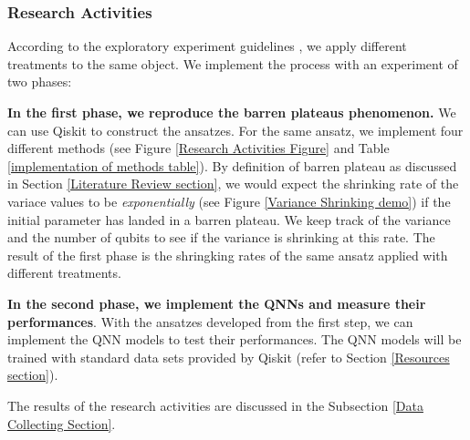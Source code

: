 \subsubsection{Research Activities} \label{Research Activities section}
According to the exploratory experiment guidelines \cite{wohlinExperimentationSoftwareEngineering2012}, we apply different treatments to the same object.
We implement the process with an experiment of two phases:

\textbf{In the first phase, we reproduce the barren plateaus phenomenon.}
We can use Qiskit \cite{Qiskit} to construct the ansatzes.
For the same ansatz, we implement four different methods (see Figure \ref{Research Activities Figure} and Table \ref{implementation of methods table}).
By definition of barren plateau as discussed in Section \ref{Literature Review section}, we would expect the shrinking rate of the variace values to be \textit{exponentially} (see Figure \ref{Variance Shrinking demo}) if the initial parameter has landed in a barren plateau.
We keep track of the variance and the number of qubits to see if the variance is shrinking at this rate.
The result of the first phase is the shringking rates of the same ansatz applied with different treatments.

\textbf{In the second phase, we implement the QNNs and measure their performances}.
With the ansatzes developed from the first step, we can implement the QNN models to test their performances.
The QNN models will be trained with standard data sets provided by Qiskit (refer to Section \ref{Resources section}).

The results of the research activities are discussed in the Subsection \ref{Data Collecting Section}.

